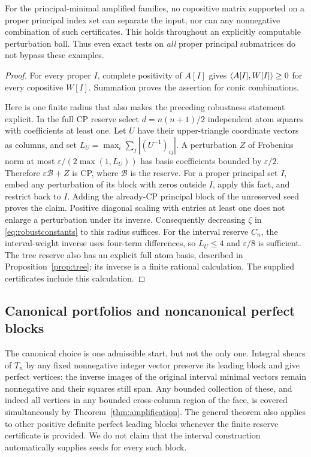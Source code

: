 \begin{corollary}\label{cor:principaltests}
For the principal-minimal amplified families, no copositive matrix supported on a proper principal index set can separate the input, nor can any nonnegative combination of such certificates. This holds throughout an explicitly computable perturbation ball. Thus even exact tests on \emph{all} proper principal submatrices do not bypass these examples.
\end{corollary}
\begin{proof}
For every proper $I$, complete positivity of $A[I]$ gives $\langle A[I],W[I]\rangle\ge0$ for every copositive $W[I]$. Summation proves the assertion for conic combinations.

Here is one finite radius that also makes the preceding robustness statement explicit. In the full CP reserve select $d=n(n+1)/2$ independent atom squares with coefficients at least one. Let $U$ have their upper-triangle coordinate vectors as columns, and set $L_U=\max_i\sum_j|(U^{-1})_{ij}|$. A perturbation $Z$ of Frobenius norm at most $\varepsilon/(2\max(1,L_U))$ has basis coefficients bounded by $\varepsilon/2$. Therefore $\varepsilon\mathcal B+Z$ is CP, where $\mathcal B$ is the reserve. For a proper principal set $I$, embed any perturbation of its block with zeros outside $I$, apply this fact, and restrict back to $I$. Adding the already-CP principal block of the unreserved seed proves the claim. Positive diagonal scaling with entries at least one does not enlarge a perturbation under its inverse. Consequently decreasing $\zeta$ in \eqref{eq:robustconstants} to this radius suffices. For the interval reserve $C_n$, the interval-weight inverse uses four-term differences, so $L_U\le4$ and $\varepsilon/8$ is sufficient. The tree reserve also has an explicit full atom basis, described in Proposition~\ref{prop:tree}; its inverse is a finite rational calculation. The supplied certificates include this calculation.
\end{proof}

\subsection{Canonical portfolios and noncanonical perfect blocks}
The canonical choice is one admissible start, but not the only one. Integral shears of $T_n$ by any fixed nonnegative integer vector preserve its leading block and give perfect vertices: the inverse images of the original interval minimal vectors remain nonnegative and their squares still span. Any bounded collection of these, and indeed all vertices in any bounded cross-column region of the face, is covered simultaneously by Theorem~\ref{thm:amplification}. The general theorem also applies to other positive definite perfect leading blocks whenever the finite reserve certificate is provided. We do not claim that the interval construction automatically supplies seeds for every such block.


